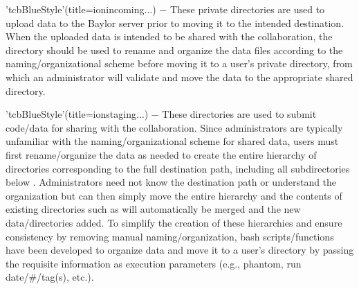 \begin{tcbenvironment}
\begin{tcbparagraph}
\end{tcbparagraph}
\begin{tcbparagraph}'tcbBlueStyle'(title=\dirsep ion\dirsep incoming\dirsep{}\dirsep$\dots$)
$\boldsymbol{-}$ These private directories are used to upload data to the Baylor server prior to moving it to the intended destination.  When the uploaded data is intended to be shared with the collaboration, the directory should be used to rename and organize the data files according to the naming/organizational scheme before moving it to a user's private  directory, from which an administrator will validate and move the data to the appropriate shared directory.
\end{tcbparagraph}
\begin{tcbparagraph}'tcbBlueStyle'(title=\dirsep ion\dirsep staging\dirsep{}\dirsep$\dots$)
$\boldsymbol{-}$ These directories are used to submit code/data for sharing with the collaboration.  Since administrators are typically unfamiliar with the naming/organizational scheme for shared data, users must first rename/organize the data as needed to create the entire hierarchy of directories corresponding to the full destination path, including all subdirectories below .  Administrators need not know the destination path or understand the organization but can then simply move the entire hierarchy and the contents of existing directories such as  will automatically be merged and the new data/directories added.  To simplify the creation of these hierarchies and ensure consistency by removing manual naming/organization, bash scripts/functions have been developed to organize data and move it to a user's  directory by passing the requisite information as execution parameters (e.g., phantom, run date/\#/tag(s), etc.).\\[\tcbparskip]

\end{tcbparagraph}
\end{tcbenvironment}
